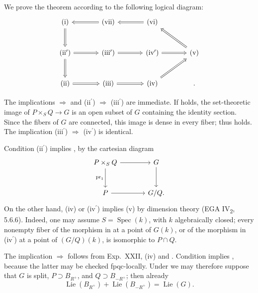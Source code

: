 \SGAProof
We prove the theorem according to the following logical diagram:
\[
\begin{tikzcd}[column sep=large,row sep=large]
 \textup{(i)} \arrow[d,Rightarrow] &
 \textup{(vii)} \arrow[l,Rightarrow] &
 \textup{(vi)} \arrow[l,Rightarrow] \\
 \textup{(ii\(^{\prime}\))} \arrow[d,Rightarrow] \arrow[r,Rightarrow] &
 \textup{(iii\(^{\prime}\))} \arrow[r,Rightarrow] &
 \textup{(iv\(^{\prime}\))} \arrow[r,Rightarrow] &
 \textup{(v)} \arrow[ul,Rightarrow] \\
 \textup{(ii)} \arrow[r,Rightarrow] &
 \textup{(iii)} \arrow[r,Rightarrow] &
 \textup{(iv)} \arrow[ur,Rightarrow] &
 {} .
\end{tikzcd}
\]

The implications \textup{} \(\Rightarrow\) \textup{} and
\textup{(ii\(^{\prime}\))} \(\Rightarrow\)
\textup{(iii\(^{\prime}\))} are immediate.  If \textup{} holds,
the set-theoretic image of \(P\times_SQ\to G\) is an open subset of
\(G\) containing the identity section.  Since the fibers of \(G\) are
connected, this image is dense in every fiber; thus \textup{}
holds.  The implication
\textup{(iii\(^{\prime}\))} \(\Rightarrow\)
\textup{(iv\(^{\prime}\))} is identical.

Condition \textup{(ii\(^{\prime}\))} implies \textup{}, by the
cartesian diagram
\[
\begin{tikzcd}[column sep=large,row sep=large]
 P\times_SQ \arrow[r] \arrow[d,"\operatorname{pr}_1"'] & G \arrow[d]\\
 P \arrow[r] & G/Q .
\end{tikzcd}
\]
On the other hand, \textup{(iv)} or \textup{(iv\(^{\prime}\))}
implies \textup{(v)} by dimension theory (EGA
IV\textsubscript{2}, 5.6.6).  Indeed, one may assume
\(S=\operatorname{Spec}(k)\), with \(k\) algebraically closed; every
nonempty fiber of the morphism in \textup{} at a point of \(G(k)\),
or of the morphism in \textup{(iv\(^{\prime}\))} at a point of
\((G/Q)(k)\), is isomorphic to \(P\cap Q\).

The implication \textup{} \(\Rightarrow\) \textup{} follows
from Exp.\ XXII,  \textup{(iv)} and .  Condition
\textup{} implies \textup{}, because the latter may be checked
fpqc-locally.  Under \textup{} we may therefore suppose that
\(G\) is split, \(P\supset B_{R^+}\), and
\(Q\supset B_{-R^+}\); then already
\[
 \operatorname{Lie}(B_{R^+})+\operatorname{Lie}(B_{-R^+})
 =\operatorname{Lie}(G).
\]

